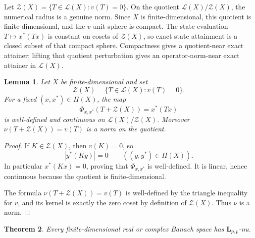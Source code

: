 \documentclass[11pt]{amsart}
\newtheorem{theorem}{Theorem}
\newtheorem{lemma}[theorem]{Lemma}
\theoremstyle{definition}
\theoremstyle{remark}
\newcommand{\Lcal}{\mathcal L}
\newcommand{\Zcal}{\mathcal Z}
\newcommand{\PiX}{\Pi(X)}
\begin{document}
Let \(\Zcal(X)=\{T\in\Lcal(X):v(T)=0\}\). On the quotient
\(\Lcal(X)/\Zcal(X)\), the numerical radius is a genuine norm. Since \(X\) is
finite-dimensional, this quotient is finite-dimensional, and the \(v\)-unit
sphere is compact. The state evaluation \(T\mapsto x^*(Tx)\) is constant on
cosets of \(\Zcal(X)\), so exact state attainment is a closed subset of that
compact sphere. Compactness gives a quotient-near exact attainer; lifting that
quotient perturbation gives an operator-norm-near exact attainer in
\(\Lcal(X)\).

\begin{lemma}\label{lem:quotient}
Let \(X\) be finite-dimensional and set
\[
  \Zcal(X)=\{T\in\Lcal(X):v(T)=0\}.
\]
For a fixed \((x,x^*)\in\PiX\), the map
\[
  \Phi_{x,x^*}(T+\Zcal(X))=x^*(Tx)
\]
is well-defined and continuous on \(\Lcal(X)/\Zcal(X)\). Moreover
\(\nu(T+\Zcal(X))=v(T)\) is a norm on the quotient.
\end{lemma}

\begin{proof}
If \(K\in\Zcal(X)\), then \(v(K)=0\), so
\[
  |y^*(Ky)|=0 \qquad ((y,y^*)\in\Pi(X)).
\]
In particular \(x^*(Kx)=0\), proving that \(\Phi_{x,x^*}\) is well-defined.
It is linear, hence continuous because the quotient is finite-dimensional.

The formula \(\nu(T+\Zcal(X))=v(T)\) is well-defined by the triangle
inequality for \(v\), and its kernel is exactly the zero coset by definition
of \(\Zcal(X)\). Thus \(\nu\) is a norm.
\end{proof}

\begin{theorem}\label{thm:main}
Every finite-dimensional real or complex Banach space has
\(\mathbf L_{p,p}\)-nu.
\end{theorem}
\end{document}
